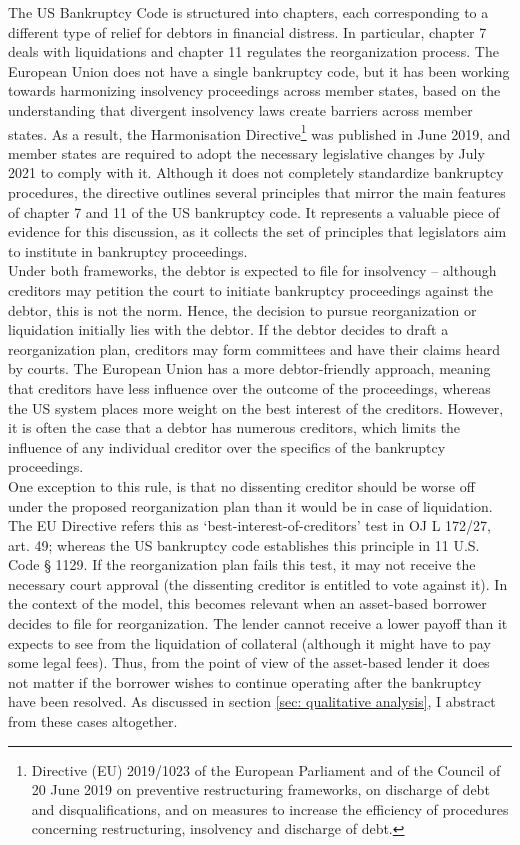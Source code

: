 \documentclass[12pt]{article}
\begin{document}
The US Bankruptcy Code is structured into chapters, each corresponding to a different type of relief for debtors in financial distress. In particular, chapter 7 deals with liquidations and chapter 11 regulates the reorganization process. The European Union does not have a single bankruptcy code, but it has been working towards harmonizing insolvency proceedings across member states, based on the understanding that divergent insolvency laws create barriers across member states. As a result, the Harmonisation Directive\footnote{Directive (EU) 2019/1023 of the European Parliament and of the Council of 20 June 2019 on preventive restructuring frameworks, on discharge of debt and disqualifications, and on measures to increase the efficiency of procedures concerning restructuring, insolvency and discharge of debt.}  was published in June 2019, and member states are required to adopt the necessary legislative changes by July 2021 to comply with it. Although it does not completely standardize bankruptcy procedures, the directive outlines several principles that mirror the main features of chapter 7 and 11 of the US bankruptcy code. It represents a valuable piece of evidence for this discussion, as it collects the set of principles that legislators aim to institute in bankruptcy proceedings. \vspace{3mm} \\
Under both frameworks, the debtor is expected to file for insolvency – although creditors may petition the court to initiate bankruptcy proceedings against the debtor, this is not the norm. Hence, the decision to pursue reorganization or liquidation initially lies with the debtor. If the debtor decides to draft a reorganization plan, creditors may form committees and have their claims heard by courts. The European Union has a more debtor-friendly approach, meaning that creditors have less influence over the outcome of the proceedings, whereas the US system places more weight on the best interest of the creditors. However, it is often the case that a debtor has numerous creditors, which limits the influence of any individual creditor over the specifics of the bankruptcy proceedings. \vspace{3mm} \\
One exception to this rule, is that no dissenting creditor should be worse off under the proposed reorganization plan than it would be in case of liquidation. The EU Directive refers this as ‘best-interest-of-creditors’ test in OJ L 172/27, art. 49; whereas the US bankruptcy code establishes this principle in 11 U.S. Code § 1129.  If the reorganization plan fails this test, it may not receive the necessary court approval (the dissenting creditor is entitled to vote against it). In the context of the model, this becomes relevant when an asset-based borrower decides to file for reorganization. The lender cannot receive a lower payoff than it expects to see from the liquidation of collateral (although it might have to pay some legal fees). Thus, from the point of view of the asset-based lender it does not matter if the borrower wishes to continue operating after the bankruptcy have been resolved. As discussed in section \ref{sec: qualitative analysis}, I abstract from these cases altogether.  \vspace{3mm} \\
\end{document}
